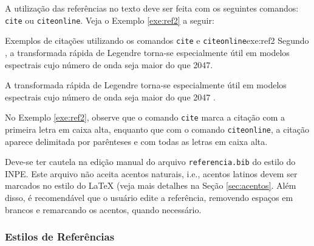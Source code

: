 A utilização das referências no texto deve ser feita com os seguintes comandos: {\tt cite} ou {\tt citeonline}. Veja o Exemplo \ref{exe:ref2} a seguir:

\begin{texexptitled}[breakable,center lower,enhanced,middle=2mm]{Exemplos de citações utilizando os comandos {\tt cite} e {\tt citeonline}}{exe:ref2}
Segundo , a transformada rápida de Legendre torna-se especialmente útil em modelos espectrais cujo número de onda seja maior do que 2047.

A transformada rápida de Legendre torna-se especialmente útil em modelos espectrais cujo número de onda seja maior do que 2047 \cite{wedietal/2013}.
\end{texexptitled}

No Exemplo \ref{exe:ref2}, observe que o comando {\tt cite} marca a citação com a primeira letra em caixa alta, enquanto que com o comando {\tt citeonline}, a citação aparece delimitada por parênteses e com todas as letras em caixa alta. 


%
%
%
%
%
%
%
%

\begin{marker}
  Deve-se ter cautela na edição manual do arquivo {\tt referencia.bib} do estilo do INPE. Este arquivo não aceita acentos naturais, i.e., acentos latinos devem ser marcados no estilo do \LaTeX{} (veja mais detalhes na Seção \ref{sec:acentos}. Além disso, é recomendável que o usuário edite a referência, removendo espaços em brancos e remarcando os acentos, quando necessário.
\end{marker}

\subsubsection*{Estilos de Referências}
\label{sec:estilos_refs}

